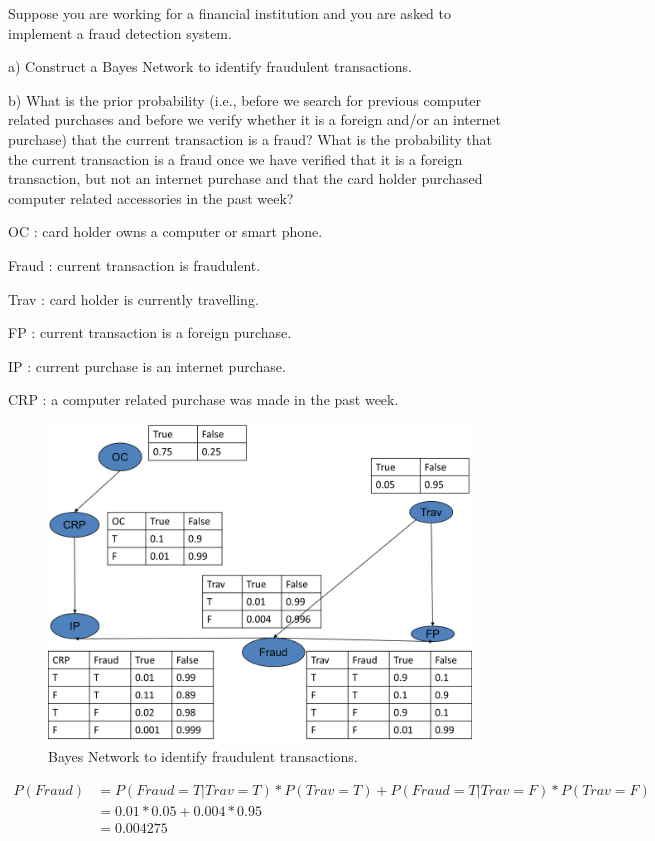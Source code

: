 \documentclass[12pt]{article}
\newenvironment{problem}[2][Problem]{\begin{trivlist}
\item[\hskip \labelsep {\bfseries #1}\hskip \labelsep {\bfseries #2.}]}{\end{trivlist}}
\begin{document}
\newpage
\begin{problem}{3} Suppose you are working for a financial institution and you are asked to implement a fraud detection
system. 


	a) Construct a Bayes Network to identify fraudulent transactions. 
	
	b) What is the prior probability (i.e., before we search for previous computer related purchases and before we verify
whether it is a foreign and/or an internet purchase) that the current transaction is a fraud? What is the probability that
the current transaction is a fraud once we have verified that it is a foreign transaction, but not an internet purchase
and that the card holder purchased computer related accessories in the past week?
	
	OC : card holder owns a computer or smart phone.

	Fraud : current transaction is fraudulent.

	Trav : card holder is currently travelling.

	FP : current transaction is a foreign purchase.

	IP : current purchase is an internet purchase.

	CRP : a computer related purchase was made in the past week.
	\begin{figure}[h]
		\centering
		\includegraphics[width=1\textwidth]{fig/Picture1.png}
		\caption{Bayes Network to identify fraudulent transactions.}
		\label{fig:q3}
	\end{figure}

		     	 \begin{align*}
				 P(Fraud)
				 & = P(Fraud=T|Trav=T) * P(Trav =T) + P(Fraud=T|Trav=F) * P(Trav = F) \\
				 & = 0.01 * 0.05 + 0.004 * 0.95 \\
				 & =0.004275 \\
			 \end{align*}


\end{problem}
\end{document}
